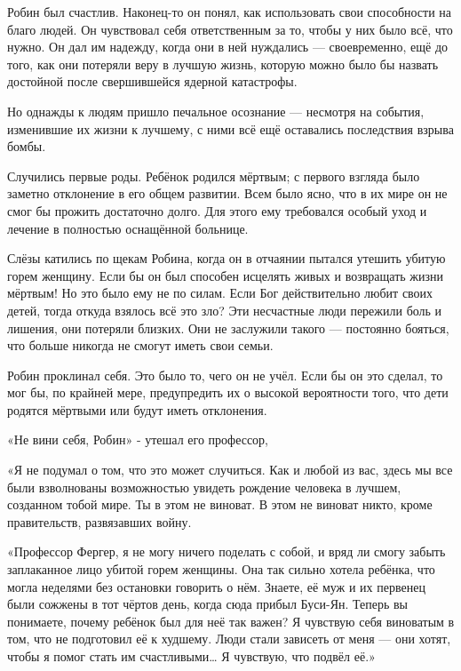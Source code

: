 \documentclass[a4paper,12pt]{book}
\begin{document}
\par
Робин был счастлив. Наконец-то он понял, как использовать свои способности на благо людей. Он чувствовал себя ответственным за то, чтобы у них было всё, что нужно. Он дал им надежду, когда они в ней нуждались — своевременно, ещё до того, как они потеряли веру в лучшую жизнь, которую можно было бы назвать достойной после свершившейся ядерной катастрофы.\\
\par
Но однажды к людям пришло печальное осознание — несмотря на события, изменившие их жизни к лучшему, с ними всё ещё оставались последствия взрыва бомбы.
\par
Случились первые роды. Ребёнок родился мёртвым; с первого взгляда было заметно отклонение в его общем развитии. Всем было ясно, что в их мире он не смог бы прожить достаточно долго. Для этого ему требовался особый уход и лечение в полностью оснащённой больнице.
\par
Слёзы катились по щекам Робина, когда он в отчаянии пытался утешить убитую горем женщину. Если бы он был способен исцелять живых и возвращать жизни мёртвым! Но это было ему не по силам. Если Бог действительно любит своих детей, тогда откуда взялось всё это зло? Эти несчастные люди пережили боль и лишения, они потеряли близких. Они не заслужили такого — постоянно бояться, что больше никогда не смогут иметь свои семьи.
\par
Робин проклинал себя. Это было то, чего он не учёл. Если бы он это сделал, то мог бы, по крайней мере, предупредить их о высокой вероятности того, что дети родятся мёртвыми или будут иметь отклонения.
\par
«Не вини себя, Робин» - утешал его профессор,
\par
«Я не подумал о том, что это может случиться. Как и любой из вас, здесь мы все были взволнованы возможностью увидеть рождение человека в лучшем, созданном тобой мире. Ты в этом не виноват. В этом не виноват никто, кроме правительств, развязавших войну.
\par
«Профессор Фергер, я не могу ничего поделать с собой, и вряд ли смогу забыть заплаканное лицо убитой горем женщины. Она так сильно хотела ребёнка, что могла неделями без остановки говорить о нём. Знаете, её муж и их первенец были сожжены в тот чёртов день, когда сюда прибыл Буси-Ян. Теперь вы понимаете, почему ребёнок был для неё так важен? Я чувствую себя виноватым в том, что не подготовил её к худшему. Люди стали зависеть от меня — они хотят, чтобы я помог стать им счастливыми… Я чувствую, что подвёл её.»
\end{document}
